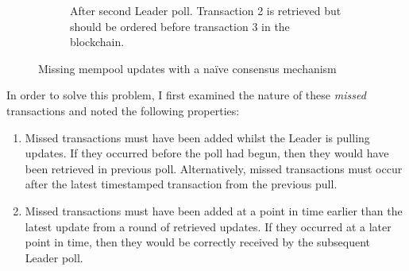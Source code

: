 \documentclass[12pt,a4paper,twoside,openright]{report}
\begin{document}
\begin{figure}
\begin{subfigure}[t]{0.45\textwidth}
			\caption{After second Leader poll. Transaction 2 is retrieved but should be ordered before transaction 3 in the blockchain.}
		\end{subfigure}
		\caption{Missing mempool updates with a na\"{i}ve consensus mechanism}	
		\label{fig:readremotepartudpatesbroke}
	\end{figure}

	In order to solve this problem, I first examined the nature of these \textit{missed} transactions and noted the following properties:
	\begin{enumerate}
		\item Missed transactions must have been added whilst the Leader is pulling updates. 
		If they occurred before the poll had begun, then they would have been retrieved in previous poll. 
		Alternatively, missed transactions must occur after the latest timestamped transaction from the previous pull. 
		\item Missed transactions must have been added at a point in time earlier than the latest update from a round of retrieved updates.
		If they occurred at a later point in time, then they would be correctly received by the subsequent Leader poll.
	\end{enumerate}
\end{document}
